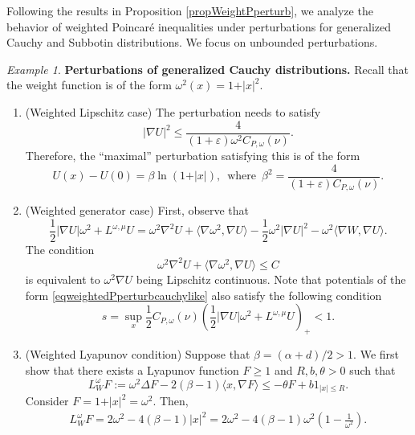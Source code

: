 \documentclass[11pt,reqno]{amsart}
\numberwithin{equation}{section}
\theoremstyle{definition}
\theoremstyle{remark}
\newtheorem{example}[theorem]{Example}
\begin{document}
Following the results in Proposition \ref{propWeightPperturb}, we analyze the behavior of weighted Poincar\'e inequalities under perturbations for generalized Cauchy and Subbotin distributions. We focus on unbounded perturbations.
\begin{example}\label{exwPcauchyperturbed}
 \textbf{Perturbations of generalized Cauchy distributions.} 
Recall that the weight function is of the form $\omega^2(x) = 1+\vert x\vert^2$.
\begin{enumerate}
    \item[(a)] (Weighted Lipschitz case) The perturbation needs to satisfy
    \begin{equation*}
        \vert \nabla U\vert^2\leq \frac{4}{(1+\varepsilon)\omega^2C_{P, \omega}(\nu)}.
    \end{equation*}
    Therefore, the ``maximal'' perturbation satisfying this is of the form
    \begin{equation}\label{eqweightedPperturbcauchylike}
        U(x)-U(0) = \beta \ln(1+\vert x\vert),\,\,\, \text{where}\,\,\,\beta^2=\frac{4}{(1+\varepsilon)C_{P, \omega}(\nu)}.     
    \end{equation}
    \item[(b)] (Weighted generator case) First, observe that
    $$\frac12|\nabla U|\omega^2+L^{\omega,\mu}U=\omega^2\nabla^2U+\langle\nabla\omega^2,\nabla U\rangle-\frac{1}{2}\omega^2\vert \nabla U\vert^2-\omega^2\langle \nabla W, \nabla U\rangle.$$
    The condition
    \begin{equation*}
        \omega^2\nabla^2U+\langle\nabla\omega^2,\nabla U\rangle\leq C
    \end{equation*}
    is equivalent to $\omega^2\nabla U$ being Lipschitz continuous.
    Note that potentials of the form \eqref{eqweightedPperturbcauchylike} also satisfy the following condition
\begin{equation}\label{eqconditionweightedlyapcaseperturb}
        s=\sup_x \frac{1}{2}C_{P,\omega}(\nu)\left(\frac12|\nabla U|\omega^2+L^{\omega,\mu}U\right)_+<1.
    \end{equation}
    \item[(c)] (Weighted Lyapunov condition) Suppose that $\beta=(\alpha+d)/2>1$. We first show that there exists a Lyapunov function $F\geq 1$ and $R, b, \theta>0$ such that
    $$L_W^\omega F:= \omega^2\Delta F-2(\beta -1)\langle x, \nabla F\rangle\leq -\theta F + b1_{\vert x\vert\leq R}.$$
    Consider $F = 1+\vert x\vert^2 = \omega^2$. Then,
    \begin{align*}
        L_W^\omega F= 2\omega^2 -4(\beta-1)\vert x\vert^2 = 2\omega^2-4(\beta-1)\omega^2\left(1-\frac{1}{\omega^2}\right).

\end{align*}
\end{enumerate}
\end{example}
\end{document}
